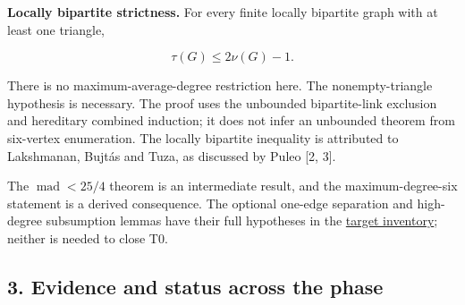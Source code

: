 \documentclass[11pt,a4paper]{article}
\begin{document}
\textbf{Locally bipartite strictness.} For every finite locally bipartite graph with at least one triangle,

\[\tau(G)\le2\nu(G)-1.\]

There is no maximum-average-degree restriction here. The nonempty-triangle hypothesis is necessary. The proof uses the unbounded bipartite-link exclusion and hereditary combined induction; it does not infer an unbounded theorem from six-vertex enumeration. The locally bipartite inequality is attributed to Lakshmanan, Bujtás and Tuza, as discussed by Puleo {[}2, 3{]}.

The \(\operatorname{mad}<25/4\) theorem is an intermediate result, and the maximum-degree-six statement is a derived consequence. The optional one-edge separation and high-degree subsumption lemmas have their full hypotheses in the \href{https://github.com/pappa211/ai-math-experiments/blob/main/problems/TUZA-15/verification/FROZEN_TARGETS.md}{target inventory}; neither is needed to close T0.

\clearpage\subsection{3. Evidence and status across the phase}\label{evidence-and-status-across-the-phase}
\end{document}
